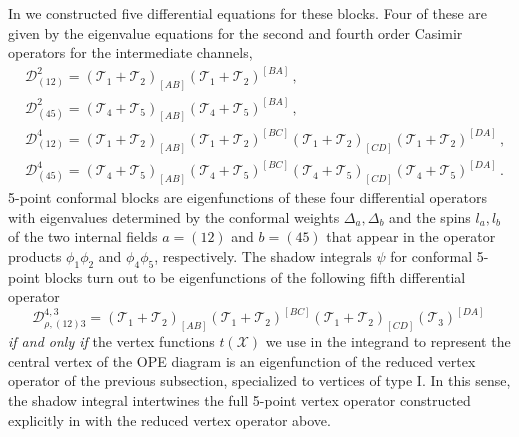 \documentclass{article}
\begin{document}
In \cite{Buric:2021ywo} we constructed five differential equations for these blocks. 
Four of these are given by the eigenvalue equations for the second and fourth order 
Casimir operators for the intermediate channels,
\begin{align}
		&\mathcal{D}^{2}_{(12)}=\left(\mathcal{T}_1+\mathcal{T}_2\right)_{[AB]}
		\left(\mathcal{T}_1+\mathcal{T}_2\right)^{[BA]}\,,\label{fivepointsQuadCasimir12}\\
		&\mathcal{D}^{2}_{(45)}=\left(\mathcal{T}_4+\mathcal{T}_5\right)_{[AB]}
		\left(\mathcal{T}_4+\mathcal{T}_5\right)^{[BA]}\,,\label{fivepointsQuadCasimir45}\\
		&\mathcal{D}^{4}_{(12)}=\left(\mathcal{T}_1+\mathcal{T}_2\right)_{[AB]}
		\left(\mathcal{T}_1+\mathcal{T}_2\right)^{[BC]}
		\left(\mathcal{T}_1+\mathcal{T}_2\right)_{[CD]}
		\left(\mathcal{T}_1+\mathcal{T}_2\right)^{[DA]}\,,\\
		&\mathcal{D}^{4}_{(45)}=\left(\mathcal{T}_4+\mathcal{T}_5\right)_{[AB]}
		\left(\mathcal{T}_4+\mathcal{T}_5\right)^{[BC]}
		\left(\mathcal{T}_4+\mathcal{T}_5\right)_{[CD]}
		\left(\mathcal{T}_4+\mathcal{T}_5\right)^{[DA]}\,. 
\end{align} 		
5-point conformal blocks are eigenfunctions of these four differential operators 
with eigenvalues determined by the conformal weights $\Delta_a, \Delta_b$ and the 
spins $l_a,l_b$ of the two internal fields $a=(12)$ and $b=(45)$ that appear in the 
operator products  $\phi_1 \phi_2$ and $\phi_4\phi_5$, respectively. The shadow 
integrals $\psi$ for conformal 5-point blocks turn out to be eigenfunctions of 
the following fifth differential operator 
\begin{equation} 		
		\mathcal{D}_{\rho,(12)3}^{4,3}=\left(\mathcal{T}_1+\mathcal{T}_2\right)_{[AB]}\left(\mathcal{T}_1+\mathcal{T}_2\right)^{[BC]}\left(\mathcal{T}_1+\mathcal{T}_2\right)_{[CD]}\left(\mathcal{T}_3\right)^{[DA]}\,
	    \label{fivepointsvertexop}
\end{equation} 
\textit{if and only if} the vertex functions $t(\mathcal{X})$ we use in the integrand to 
represent the central vertex of the OPE diagram is an eigenfunction of the reduced 
vertex operator of the previous subsection, specialized to vertices of type I. 
In this sense, the shadow integral intertwines the full 5-point vertex 
operator constructed explicitly in \cite{Buric:2021ywo} with the reduced vertex 
operator above. 
\medskip 
\end{document}

